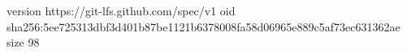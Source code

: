 version https://git-lfs.github.com/spec/v1
oid sha256:5ee725313dbf3d401b87be1121b6378008fa58d06965e889c5af73ec631362ae
size 98
